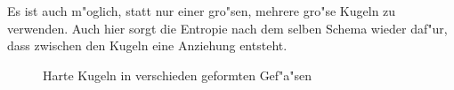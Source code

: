 Es ist auch m"oglich, statt nur einer gro"sen, mehrere gro"se Kugeln zu
verwenden. Auch hier sorgt die Entropie nach dem selben Schema wieder
daf"ur, dass zwischen den Kugeln eine Anziehung entsteht.

\begin{figure}
   \centering 
   \caption{Harte Kugeln in verschieden geformten Gef"a"sen}%
   \label{abb_harte-kugeln_gefaesse}
\end{figure}
































